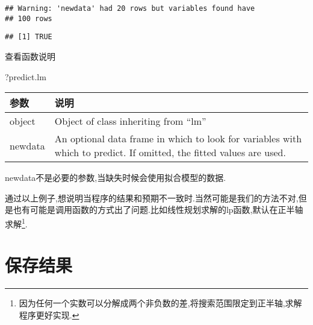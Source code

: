 \documentclass[]{ctexbook}
\newenvironment{Shaded}{\begin{snugshade}}{\end{snugshade}}
\newcommand{\NormalTok}[1]{#1}
\begin{document}
\begin{verbatim}
## Warning: 'newdata' had 20 rows but variables found have
## 100 rows
\end{verbatim}

\begin{verbatim}
## [1] TRUE
\end{verbatim}

查看函数说明

\begin{Shaded}
\begin{Highlighting}[]
\NormalTok{?predict.lm}
\end{Highlighting}
\end{Shaded}

\begin{longtable}[]{@{}ll@{}}
\toprule
\begin{minipage}[b]{0.13\columnwidth}\raggedright
参数\strut
\end{minipage} & \begin{minipage}[b]{0.81\columnwidth}\raggedright
说明\strut
\end{minipage}\tabularnewline
\midrule
\endhead
\begin{minipage}[t]{0.13\columnwidth}\raggedright
object\strut
\end{minipage} & \begin{minipage}[t]{0.81\columnwidth}\raggedright
Object of class inheriting from ``lm''\strut
\end{minipage}\tabularnewline
\begin{minipage}[t]{0.13\columnwidth}\raggedright
newdata\strut
\end{minipage} & \begin{minipage}[t]{0.81\columnwidth}\raggedright
An optional data frame in which to look for variables with which to predict. If omitted, the fitted values are used.\strut
\end{minipage}\tabularnewline
\bottomrule
\end{longtable}

newdata不是必要的参数,当缺失时候会使用拟合模型的数据.

通过以上例子,想说明当程序的结果和预期不一致时.当然可能是我们的方法不对,但是也有可能是调用函数的方式出了问题.比如线性规划求解的lp函数,默认在正半轴求解\footnote{因为任何一个实数可以分解成两个非负数的差,将搜索范围限定到正半轴,求解程序更好实现.}.

\hypertarget{section-6}{%
\section{保存结果}\label{section-6}}
\end{document}
